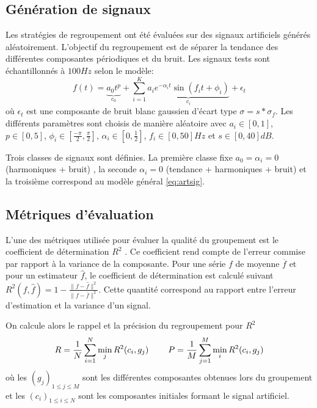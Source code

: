 \documentclass{gretsi}
\newcommand{\inter}{\left[0, 1\right]}
\begin{document}
\subsection{Génération de signaux}
\label{sub:artsig}

    Les stratégies de regroupement ont été évaluées sur des signaux artificiels générés aléatoirement.
    L'objectif du regroupement est de séparer la tendance des différentes composantes périodiques et du bruit. Les signaux tests sont échantillonnés à $100Hz$ selon le modèle:
    \begin{equation}\label{eq:artsig}
    f(t) = \underbrace{a_0 t^p}_{c_0} + \sum_{i=1}^K \underbrace{a_i e^{-\alpha_i t} \sin\left(f_i t + \phi_i\right)}_{c_i} + \epsilon_t
    \end{equation}
    où $\epsilon_t$  est une composante de bruit blanc gaussien d'écart type $\sigma = s*\sigma_f$.
    Les différents paramètres sont choisis de manière aléatoire avec $a_i \in \inter$, $p \in \left[0, 5\right]$, $\displaystyle \phi_i \in\left[\frac{-\pi}{2}, \frac{\pi}{2}\right]$, $\alpha_i \in \left[0, \frac{1}{2}\right]$, $f_i \in \left[0, 50\right]Hz$ et $s \in \left[0, 40\right]dB$.
   

    Trois classes de signaux sont définies.
    La première classe fixe $a_0 = \alpha_i = 0$ (harmoniques + bruit) , la seconde $\alpha_i = 0$ (tendance + harmoniques + bruit) et la troisième correspond au modèle général \eqref{eq:artsig}.


\subsection{Métriques d'évaluation}
\label{sub:met}

    L'une des métriques utilisée pour évaluer la qualité du groupement est le coefficient de détermination $R^2$ \cite{abalov_14_auto}.
    Ce coefficient rend compte de l'erreur commise par rapport à la variance de la composante.
    Pour une série $f$ de moyenne $\overline f$ et pour un estimateur $\widehat f$, le coefficient de détermination est calculé suivant $R^2(f, \widehat f) = 1 - \frac{\|f-\widehat f\|^2}{\|f-\overline f\|^2}$.
    Cette quantité correspond au rapport entre l'erreur d'estimation et la variance d'un signal.

    On calcule alors le rappel et la précision du regroupement pour $R^2$
    \begin{equation}
        R = \frac{1}{N} \sum_{i=1}^N \min_j R^2(c_i, g_j) \hspace{0.8cm} P = \frac{1}{M}\sum_{j=1}^M \min_i R^2(c_i, g_j)
    \end{equation}
    où les $(g_j)_{1\le j \le M}$ sont les différentes composantes obtenues lors du groupement et les $(c_i)_{1\le i\le N}$ sont les composantes initiales formant le signal artificiel.
    
\end{document}
